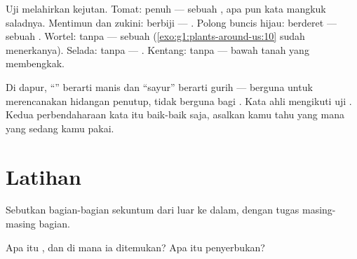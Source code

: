 \begin{example}\label{ex:g3:flowers-fruits-seeds:surprise}
Uji  melahirkan kejutan. Tomat: penuh  --- sebuah , apa
pun kata mangkuk saladnya. Mentimun dan zukini: berbiji --- .
Polong buncis hijau:  berderet --- sebuah . Wortel: tanpa 
--- sebuah  (\cref{exo:g1:plants-around-us:10} sudah menerkanya).
Selada: tanpa  --- . Kentang: tanpa  ---  bawah
tanah yang membengkak.
\end{example}

\begin{remark}\label{rem:g3:flowers-fruits-seeds:words}
Di dapur, ``'' berarti manis dan ``sayur'' berarti gurih ---
berguna untuk merencanakan hidangan penutup, tidak berguna bagi
. Kata ahli  mengikuti uji . Kedua perbendaharaan
kata itu baik-baik saja, asalkan kamu tahu yang mana yang sedang kamu
pakai.
\end{remark}

\section{Latihan}

\begin{exercise}[$\star$]\label{exo:g3:flowers-fruits-seeds:1}
Sebutkan bagian-bagian sekuntum  dari luar ke dalam, dengan tugas
masing-masing bagian.
\end{exercise}

\begin{exercise}[$\star$]\label{exo:g3:flowers-fruits-seeds:2}
Apa itu , dan di mana ia ditemukan? Apa itu penyerbukan?
\end{exercise}

